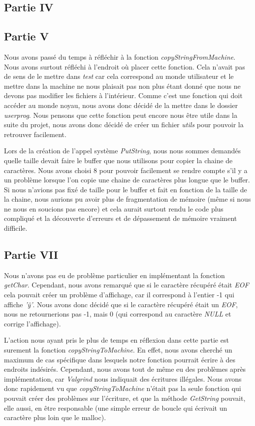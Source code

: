 \documentclass{article}
\begin{document}
\subsection{Partie IV}

\subsection{Partie V}
Nous avons passé du temps à réfléchir à la fonction
\textit{copyStringFromMachine}. Nous avons surtout réfléchi à l'endroit où
placer cette fonction. Cela n'avait pas de sens de le mettre dans \textit{test}
car cela correspond au monde utilisateur et le mettre dans la machine ne nous
plaisait pas non plus étant donné que nous ne devons pas modifier les fichiers
à l'intérieur. Comme c'est une fonction qui doit accéder au monde noyau, nous
avons donc décidé de la mettre dans le dossier \textit{userprog}. Nous pensons
que cette fonction peut encore nous être utile dans la suite du projet, nous
avons donc décidé de créer un fichier \textit{utils} pour pouvoir la retrouver
facilement.

Lors de la création de l'appel système \textit{PutString}, nous nous sommes
demandés quelle taille devait faire le buffer que nous utilisons pour copier la
chaine de caractères. Nous avons choisi 8 pour pouvoir facilement se rendre
compte s'il y a un problème lorsque l'on copie une chaine de caractères plus
longue que le buffer. Si nous n'avions pas fixé de taille pour le buffer et
fait en fonction de la taille de la chaine, nous aurions pu avoir plus de
fragmentation de mémoire (même si nous ne nous en soucions pas encore) et cela
aurait surtout rendu le code plus compliqué et la découverte d'erreurs et de
dépassement de mémoire vraiment difficile.

\subsection{Partie VII} \label{bugPartieVII}
Nous n'avons pas eu de problème particulier en implémentant la fonction
\textit{getChar}. Cependant, nous avons remarqué que si le caractère récupéré
était \textit{EOF} cela pouvait créer un problème d'affichage, car il
correspond à l'entier -1 qui affiche \textit{'ÿ'}. Nous avons donc décidé que
si le caractère récupéré était un \textit{EOF}, nous ne retournerions pas -1,
mais 0 (qui correspond au caractère \textit{NULL} et corrige l'affichage).

L'action nous ayant pris le plus de temps en réflexion dans cette partie est
surement la fonction \textit{copyStringToMachine}. En effet, nous avons cherché
un maximum de cas spécifique dans lesquels notre fonction pourrait écrire à des
endroits indésirés. Cependant, nous avons tout de même eu des problèmes après
implémentation, car \textit{Valgrind} nous indiquait des écritures illégales.
Nous avons donc rapidement vu que \textit{copyStringToMachine} n'était pas la
seule fonction qui pouvait créer des problèmes sur l'écriture, et que la
méthode \textit{GetString} pouvait, elle aussi, en être responsable (une simple
erreur de boucle qui écrivait un caractère plus loin que le malloc).
\end{document}
